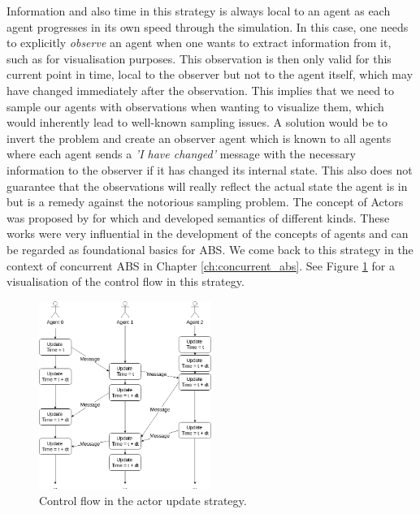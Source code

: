 Information and also time in this strategy is always local to an agent as each agent progresses in its own speed through the simulation. In this case, one needs to explicitly \textit{observe} an agent when one wants to extract information from it, such as for visualisation purposes. This observation is then only valid for this current point in time, local to the observer but not to the agent itself, which may have changed immediately after the observation. This implies that we need to sample our agents with observations when wanting to visualize them, which would inherently lead to well-known sampling issues. A solution would be to invert the problem and create an observer agent which is known to all agents where each agent sends a \textit{'I have changed'} message with the necessary information to the observer if it has changed its internal state. This also does not guarantee that the observations will really reflect the actual state the agent is in but is a remedy against the notorious sampling problem. The concept of Actors was proposed by \cite{hewitt_universal_1973} for which \cite{grief_semantics_1975} and \cite{clinger_foundations_1981} developed semantics of different kinds. These works were very influential in the development of the concepts of agents and can be regarded as foundational basics for ABS. We come back to this strategy in the context of concurrent ABS in Chapter \ref{ch:concurrent_abs}. See Figure \ref{fig:strategy_act} for a visualisation of the control flow in this strategy.

\begin{figure}[H]
	\centering
	\includegraphics[width=0.5\textwidth, angle=0]{./fig/implabs/actor.png}
	\caption[Control flow in the actor update strategy]{Control flow in the actor update strategy.}
	\label{fig:strategy_act}
\end{figure}

